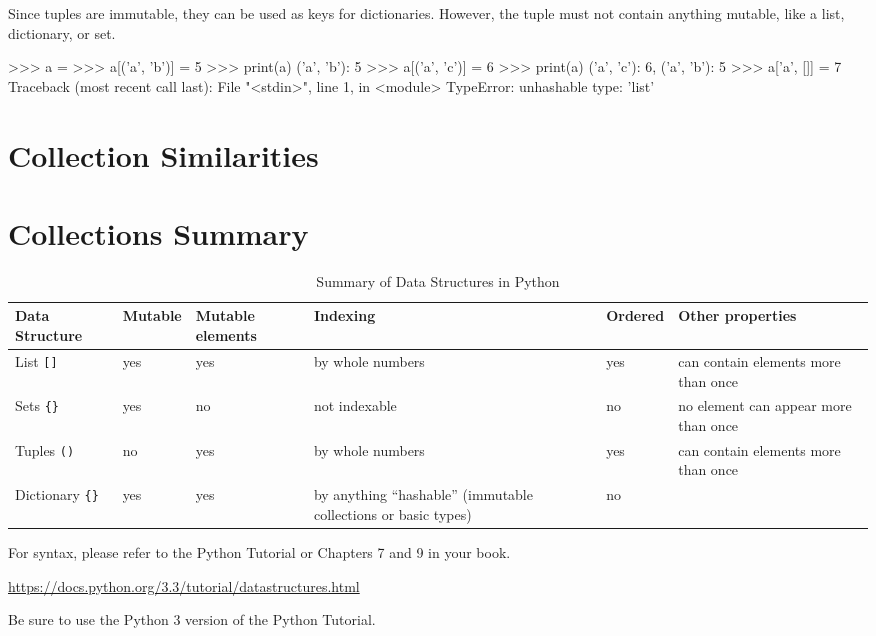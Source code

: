 \documentclass[11pt]{cselabheader}
\begin{document}
Since tuples are immutable, they can be used as keys for dictionaries.
However, the tuple must not contain anything mutable,
like a list, dictionary, or set.
\begin{pyconcode}
>>> a = {}
>>> a[('a', 'b')] = 5
>>> print(a)
{('a', 'b'): 5}
>>> a[('a', 'c')] = 6
>>> print(a)
{('a', 'c'): 6, ('a', 'b'): 5}
>>> a['a', []] = 7
Traceback (most recent call last):
  File "<stdin>", line 1, in <module>
TypeError: unhashable type: 'list'
\end{pyconcode}



\pagebreak
\section{Collection Similarities}


\section{Collections Summary}

\begin{table}[!ht]
  \centering
  \begin{tabular}{p{1.6cm}lp{1.6cm}p{3.5cm}lp{4.5cm}}
    \toprule
    Data Structure & Mutable & Mutable elements & Indexing & Ordered
    & Other
    properties\\
    \midrule
    List \lstinline![]! & yes & yes & by whole numbers & yes & can contain elements more than once\\
    Sets \lstinline!{}! & yes & no & not indexable & no & no element can appear more than once\\
    Tuples \lstinline!()! & no & yes & by whole numbers & yes & can contain elements more than
    once\\
    Dictionary \lstinline!{}! & yes & yes & by anything ``hashable'' (immutable collections or
    basic types) & no & \\
    \bottomrule
  \end{tabular}
  \caption{Summary of Data Structures in Python}
  \label{tab:sum}
\end{table}

For syntax, please refer to the Python Tutorial or Chapters 7 and 9 in your
book.
\begin{center}
  \url{https://docs.python.org/3.3/tutorial/datastructures.html}
\end{center}
Be sure to use the Python 3 version of the Python Tutorial.
\end{document}

